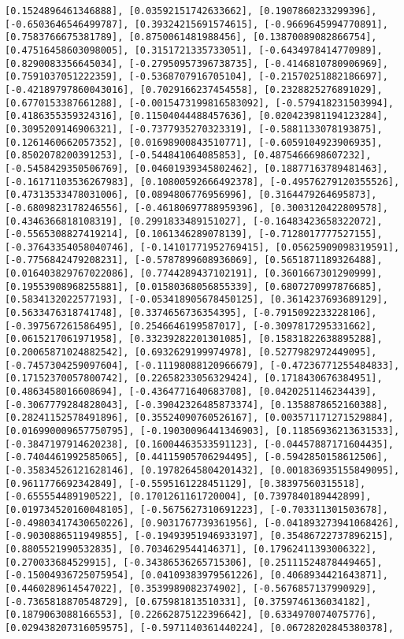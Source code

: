 \documentclass[11pt]{article}
\begin{document}
\begin{Verbatim}[commandchars=\\\{\}]
[0.1524896461346888], [0.03592151742633662], [0.1907860233299396], [-0.6503646546499787], [0.39324215691574615], [-0.9669645994770891], [0.7583766675381789], [0.8750061481988456], [0.13870089082866754], [0.47516458603098005], [0.3151721335733051], [-0.6434978414770989], [0.8290083356645034], [-0.27950957396738735], [-0.4146810780906969], [0.7591037051222359], [-0.5368707916705104], [-0.21570251882186697], [-0.42189797860043016], [0.7029166237454558], [0.2328825276891029], [0.6770153387661288], [-0.0015473199816583092], [-0.579418231503994], [0.4186355359324316], [0.11504044488457636], [0.020423981194123284], [0.3095209146906321], [-0.7377935270323319], [-0.5881133078193875], [0.1261460662057352], [0.01698900843510771], [-0.6059104923906935], [0.8502078200391253], [-0.544841064085853], [0.4875466698607232], [-0.5458429350506769], [0.04601939345802462], [0.18877163789481463], [-0.16171103536267983], [0.10800592666492378], [-0.49576279120355526], [0.47313533478031006], [0.0894806776956996], [0.3164479264695873], [-0.6809823178246556], [-0.46180697788959396], [0.3003120422809578], [0.4346366818108319], [0.2991833489151027], [-0.16483423658322072], [-0.5565308827419214], [0.1061346289078139], [-0.7128017777527155], [-0.37643354058040746], [-0.14101771952769415], [0.05625909098319591], [-0.7756842479208231], [-0.5787899608936069], [0.5651871189326488], [0.016403829767022086], [0.7744289437102191], [0.3601667301290999], [0.19553908968255881], [0.01580368056855339], [0.6807270997876685], [0.5834132022577193], [-0.053418905678450125], [0.3614237693689129], [0.5633476318741748], [0.3374656736354395], [-0.7915092233228106], [-0.397567261586495], [0.2546646199587017], [-0.3097817295331662], [0.0615217061971958], [0.33239282201301085], [0.15831822638895288], [0.20065871024882542], [0.6932629199974978], [0.5277982972449095], [-0.7457304259097604], [-0.11198088120966679], [-0.47236771255484833], [0.17152370057800742], [0.22658233056329424], [0.1718430676384951], [0.4863458016608694], [-0.4364771640683708], [0.0420251146234439], [-0.3067779284828043], [-0.39042326485873374], [0.1358878652160388], [0.28241152578491896], [0.35524090760526167], [0.003571171271529884], [0.016990009657750795], [-0.19030096441346903], [0.11856936213631533], [-0.3847197914620238], [0.16004463533591123], [-0.04457887171604435], [-0.7404461992585065], [0.44115905706294495], [-0.5942850158612506], [-0.35834526121628146], [0.19782645804201432], [0.001836935155849095], [0.9611776692342849], [-0.5595161228451129], [0.38397560315518], [-0.655554489190522], [0.1701261161720004], [0.7397840189442899], [0.019734520160048105], [-0.5675627310691223], [-0.703311301503678], [-0.49803417430650226], [0.9031767739361956], [-0.041893273941068426], [-0.9030886511949855], [-0.19493951946933197], [0.35486722737896215], [0.8805521990532835], [0.7034629544146371], [0.17962411393006322], [0.270033684529915], [-0.34386536265715306], [0.25111524878449465], [-0.15004936725075954], [0.04109383979561226], [0.4068934421643871], [0.4460289614547022], [0.3539989082374902], [-0.5676857137990929], [-0.7365818870548729], [0.675981813510331], [0.3759746136034182], [0.1879063088166553], [0.22662875122396642], [0.6334970074075776], [0.029438207316059575], [-0.5971140361440224], [0.06728202845380378], 
\end{Verbatim}
\end{document}
